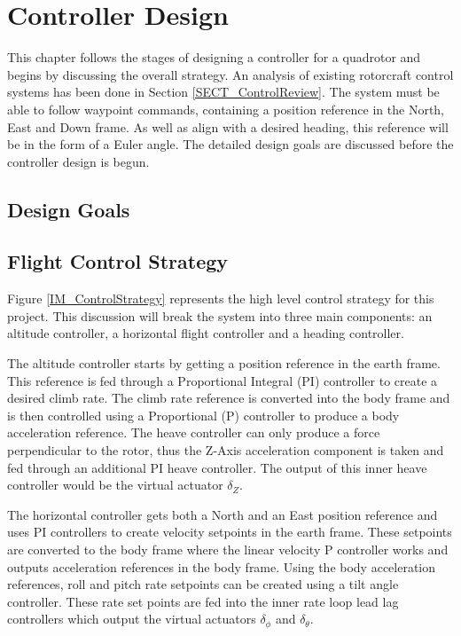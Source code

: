 \chapter{Controller Design}
This chapter follows the stages of designing a controller for a quadrotor and begins by discussing the overall strategy. An analysis of existing rotorcraft control systems has been done in Section \ref{SECT_ControlReview}. The system must be able to follow waypoint commands, containing a position reference in the North, East and Down frame. As well as align with a desired heading, this reference will be in the form of a Euler angle. The detailed design goals are discussed before the controller design is begun.

\section{Design Goals}


\section{Flight Control Strategy}
Figure \ref{IM_ControlStrategy} represents the high level control strategy for this project. This discussion will break the system into three main components: an altitude controller, a horizontal flight controller and a heading controller.	

The altitude controller starts by getting a position reference in the earth frame. This reference is fed through a Proportional Integral (PI) controller to create a desired climb rate. The climb rate reference is converted into the body frame and is then controlled using a Proportional (P) controller to produce a body acceleration reference. The heave controller can only produce a force perpendicular to the rotor, thus the Z-Axis acceleration component is taken and fed through an additional PI heave controller. The output of this inner heave controller would be the virtual actuator $\delta_Z$.

The horizontal controller gets both a North and an East position reference and uses PI controllers to create velocity setpoints in the earth frame. These setpoints are converted to the body frame where the linear velocity P controller works and outputs acceleration references in the body frame. Using the body acceleration references, roll and pitch rate setpoints can be created using a tilt angle controller. These rate set points are fed into the inner rate loop lead lag controllers which output the virtual actuators $\delta_\phi$ and $\delta_\theta$.

